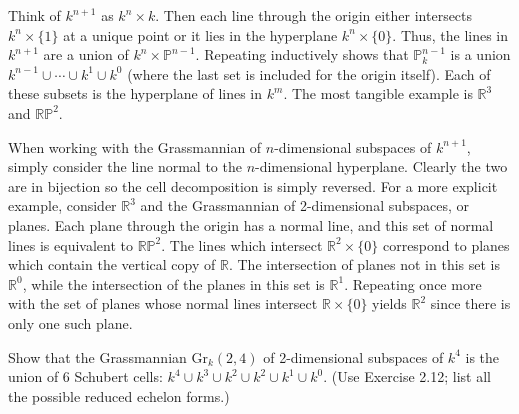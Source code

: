 \documentclass[../../master.tex]{subfiles}
\begin{document}
\begin{solution}
    Think of $k^{n+1}$ as $k^{n} \times k$.
    Then each line through the origin either intersects $k^{n} \times \{1\}$ at a unique point or it lies in the hyperplane $k^{n} \times \{0\}$.
    Thus, the lines in $k^{n+1}$ are a union of $k^{n} \times \mathbb{P}^{n-1}$.
    Repeating inductively shows that $\mathbb{P}_k^{n-1}$ is a union $k^{n-1} \cup \cdots \cup k^{1} \cup k^{0}$ (where the last set is included for the origin itself).
    Each of these subsets is the hyperplane of lines in $k^{m}$.
    The most tangible example is $\mathbb{R}^3$ and $\mathbb{RP}^2$.

    When working with the Grassmannian of $n$-dimensional subspaces of $k^{n+1}$, simply consider the line normal to the $n$-dimensional hyperplane.
    Clearly the two are in bijection so the cell decomposition is simply reversed.
    For a more explicit example, consider $\mathbb{R}^3$ and the Grassmannian of 2-dimensional subspaces, or planes.
    Each plane through the origin has a normal line, and this set of normal lines is equivalent to $\mathbb{RP}^2$.
    The lines which intersect $\mathbb{R}^2 \times \{0\}$ correspond to planes which contain the vertical copy of $\mathbb{R}$.
    The intersection of planes not in this set is $\mathbb{R}^{0}$, while the intersection of the planes in this set is $\mathbb{R}^{1}$.
    Repeating once more with the set of planes whose normal lines intersect $\mathbb{R} \times \{0\}$ yields $\mathbb{R}^2$ since there is only one such plane.
\end{solution}

\begin{problem}
    Show that the Grassmannian $\text{Gr}_k(2, 4)$ of 2-dimensional subspaces of $k^{4}$ is the union of 6 Schubert cells: $k^{4} \cup k^3 \cup k^2 \cup k^2 \cup k^{1} \cup k^{0}$.
    (Use Exercise 2.12; list all the possible reduced echelon forms.)
\end{problem}
\end{document}
